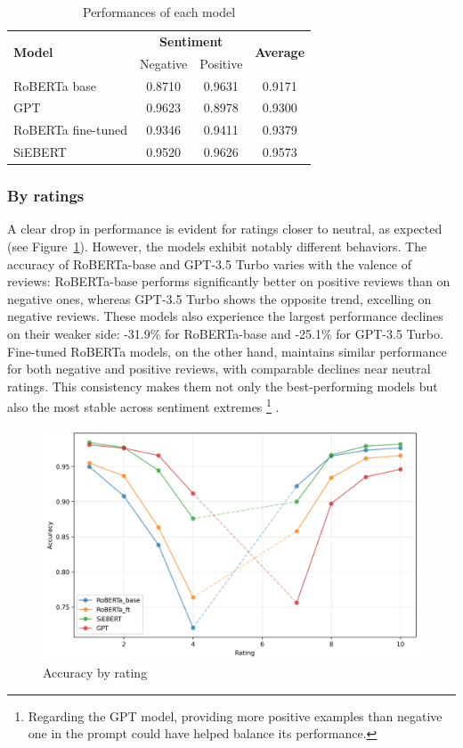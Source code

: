 \documentclass{article}
\begin{document}
\begin{table}
  \centering
  \begin{tabular}{lccc}
    \toprule
    \multirow{2}{*}{\centering \textbf{Model}} & \multicolumn{2}{c}{\textbf{Sentiment}} & \multirow{2}{*}{\centering \textbf{Average}} \\
    \cmidrule{2-3}
    & Negative & Positive \\
    \midrule
    RoBERTa base & 0.8710 & 0.9631 & 0.9171 \\
    GPT & 0.9623 & 0.8978 & 0.9300 \\
    RoBERTa fine-tuned & 0.9346 & 0.9411 & 0.9379 \\
    SiEBERT & 0.9520 & 0.9626 & 0.9573 \\
    \bottomrule
  \end{tabular}
  \vspace{0.5em}
  \caption{Performances of each model}
  \label{tab:perfs_by_sentiment}
\end{table}

\subsubsection{By ratings}

A clear drop in performance is evident for ratings closer to neutral, as expected (see Figure~\ref{fig:accuracy-ratings}). However, the models exhibit notably different behaviors. The accuracy of RoBERTa-base and GPT-3.5 Turbo varies with the valence of reviews: RoBERTa-base performs significantly better on positive reviews than on negative ones, whereas GPT-3.5 Turbo shows the opposite trend, excelling on negative reviews. These models also experience the largest performance declines on their weaker side: -31.9\% for RoBERTa-base and -25.1\% for GPT-3.5 Turbo. Fine-tuned RoBERTa models, on the other hand, maintains similar performance for both negative and positive reviews, with comparable declines near neutral ratings. This consistency makes them not only the best-performing models but also the most stable across sentiment extremes 
\footnote{Regarding the GPT model, providing more positive examples than negative one in the prompt could have helped balance its performance.}
.

\begin{figure}
  \centering
  \includegraphics[width=\textwidth]{figures/accuracy_vs_ratings.png}
  \caption{Accuracy by rating}
  \label{fig:accuracy-ratings}
\end{figure}
\end{document}
